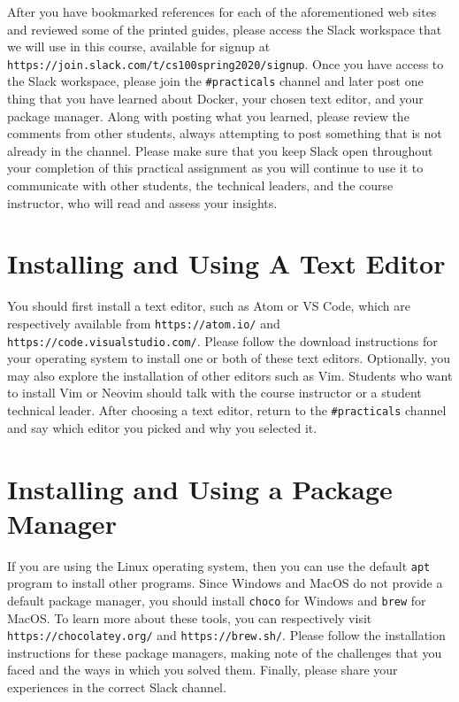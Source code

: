 \documentclass[11pt]{article}
\newcommand{\program}[1]{\lstinline{#1}}
\newcommand{\url}[1]{\lstinline{#1}}
\begin{document}
After you have bookmarked references for each of the aforementioned web sites
and reviewed some of the printed guides, please access the Slack workspace that
we will use in this course, available for signup at
\url{https://join.slack.com/t/cs100spring2020/signup}. Once you have access to
the Slack workspace, please join the \url{#practicals} channel and later post
one thing that you have learned about Docker, your chosen text editor, and your
package manager. Along with posting what you learned, please review the
comments from other students, always attempting to post something that is not
already in the channel. Please make sure that you keep Slack open throughout
your completion of this practical assignment as you will continue to use it to
communicate with other students, the technical leaders, and the course
instructor, who will read and assess your insights.

\section*{Installing and Using A Text Editor}

You should first install a text editor, such as Atom or VS Code, which are
respectively available from \url{https://atom.io/} and
\url{https://code.visualstudio.com/}. Please follow the download instructions
for your operating system to install one or both of these text editors.
Optionally, you may also explore the installation of other editors such as Vim.
Students who want to install Vim or Neovim should talk with the course
instructor or a student technical leader. After choosing a text editor, return
to the \url{#practicals} channel and say which editor you picked and why you
selected it.

\section*{Installing and Using a Package Manager}

If you are using the Linux operating system, then you can use the default
\program{apt} program to install other programs. Since Windows and MacOS do not
provide a default package manager, you should install \program{choco} for
Windows and \program{brew} for MacOS. To learn more about these tools, you can
respectively visit \url{https://chocolatey.org/} and \url{https://brew.sh/}.
Please follow the installation instructions for these package managers, making
note of the challenges that you faced and the ways in which you solved them.
Finally, please share your experiences in the correct Slack channel.
\end{document}
